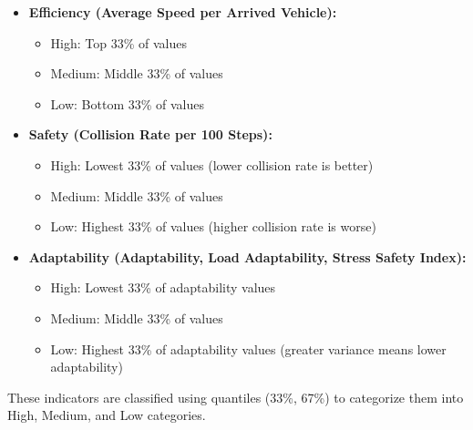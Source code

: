 \begin{itemize}
    \item \textbf{Efficiency (Average Speed per Arrived Vehicle):}
    \begin{itemize}
        \item High: Top 33\% of values
        \item Medium: Middle 33\% of values
        \item Low: Bottom 33\% of values
    \end{itemize}

    \item \textbf{Safety (Collision Rate per 100 Steps):}
    \begin{itemize}
        \item High: Lowest 33\% of values (lower collision rate is better)
        \item Medium: Middle 33\% of values
        \item Low: Highest 33\% of values (higher collision rate is worse)
    \end{itemize}

    \item \textbf{Adaptability (Adaptability, Load Adaptability, Stress Safety Index):}
    \begin{itemize}
        \item High: Lowest 33\% of adaptability values
        \item Medium: Middle 33\% of values
        \item Low: Highest 33\% of adaptability values (greater variance means lower adaptability)
    \end{itemize}
\end{itemize}

These indicators are classified using quantiles (33\%, 67\%) to categorize them into High, Medium, and Low categories.


